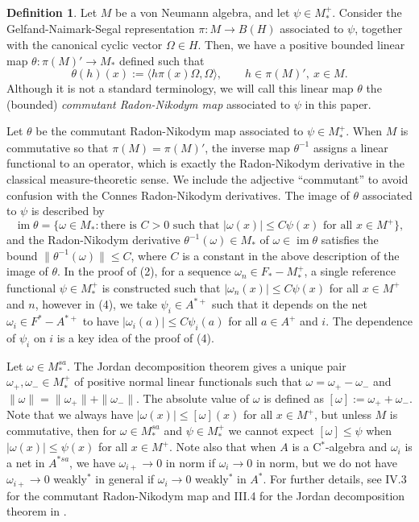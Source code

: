 \documentclass[noamsfonts,a4paper,10pt]{amsart}
\theoremstyle{plain}
\theoremstyle{definition}
\newtheorem{defn}[thm]{Definition}
\theoremstyle{remark}
\begin{document}
\begin{defn}
Let $M$ be a von Neumann algebra, and let $\psi\in M_*^+$.
Consider the Gelfand-Naimark-Segal representation $\pi:M\to B(H)$ associated to $\psi$, together with the canonical cyclic vector $\Omega\in H$.
Then, we have a positive bounded linear map $\theta:\pi(M)'\to M_*$ defined such that
\[\theta(h)(x):=\langle h\pi(x)\Omega,\Omega\rangle,\qquad h\in\pi(M)',\ x\in M.\]
Although it is not a standard terminology, we will call this linear map $\theta$ the (bounded) \emph{commutant Radon-Nikodym map} associated to $\psi$ in this paper.
\end{defn}
Let $\theta$ be the commutant Radon-Nikodym map associated to $\psi\in M_*^+$.
When $M$ is commutative so that $\pi(M)=\pi(M)'$, the inverse map $\theta^{-1}$ assigns a linear functional to an operator, which is exactly the Radon-Nikodym derivative in the classical measure-theoretic sense.
We include the adjective ``commutant'' to avoid confusion with the Connes Radon-Nikodym derivatives.
The image of $\theta$ associated to $\psi$ is described by
\[\operatorname{im}\theta=\{\omega\in M_*:\text{there is $C>0$ such that $|\omega(x)|\le C\psi(x)$ for all $x\in M^+$}\},\]
and the Radon-Nikodym derivative $\theta^{-1}(\omega)\in M_*$ of $\omega\in\operatorname{im}\theta$ satisfies the bound $\|\theta^{-1}(\omega)\|\le C$, where $C$ is a constant in the above description of the image of $\theta$.
In the proof of (2), for a sequence $\omega_n\in F_*-M_*^+$, a single reference functional $\psi\in M_*^+$ is constructed such that $|\omega_n(x)|\le C\psi(x)$ for all $x\in M^+$ and $n$, however in (4), we take $\psi_i\in A^{*+}$ such that it depends on the net $\omega_i\in F^*-A^{*+}$ to have $|\omega_i(a)|\le C\psi_i(a)$ for all $a\in A^+$ and $i$.
The dependence of $\psi_i$ on $i$ is a key idea of the proof of (4).

Let $\omega\in M_*^{sa}$.
The Jordan decomposition theorem gives a unique pair $\omega_+,\omega_-\in M_*^+$ of positive normal linear functionals such that $\omega=\omega_+-\omega_-$ and $\|\omega\|=\|\omega_+\|+\|\omega_-\|$.
The absolute value of $\omega$ is defined as $[\omega]:=\omega_++\omega_-$.
Note that we always have $|\omega(x)|\le[\omega](x)$ for all $x\in M^+$, but unless $M$ is commutative, then for $\omega\in M_*^{sa}$ and $\psi\in M_*^+$ we cannot expect $[\omega]\le\psi$ when $|\omega(x)|\le\psi(x)$ for all $x\in M^+$.
Note also that when $A$ is a C$^*$-algebra and $\omega_i$ is a net in $A^{*sa}$, we have $\omega_{i+}\to0$ in norm if $\omega_i\to0$ in norm, but we do not have $\omega_{i+}\to0$ weakly$^*$ in general if $\omega_i\to0$ weakly$^*$ in $A^*$.
For further details, see IV.3 for the commutant Radon-Nikodym map and III.4 for the Jordan decomposition theorem in \cite{MR1873025}.
\end{document}
